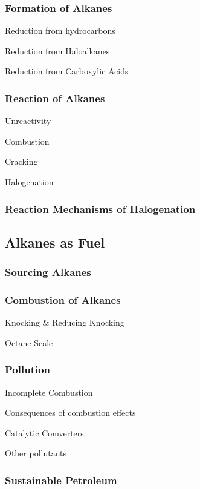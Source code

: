 \documentclass[../main]{subfiles}
\begin{document}
	\subsubsection{Formation of Alkanes}

	Reduction from hydrocarbons

	Reduction from Haloalkanes

	Reduction from Carboxylic Acids

	\subsubsection{Reaction of Alkanes}

	Unreactivity

	Combustion

	Cracking

	Halogenation

	\subsubsection{Reaction Mechanisms of Halogenation}

	\subsection{Alkanes as Fuel}

	\subsubsection{Sourcing Alkanes}

	\subsubsection{Combustion of Alkanes}

	Knocking \& Reducing Knocking

	Octane Scale

	\subsubsection{Pollution}

	Incomplete Combustion

	Consequences of combustion effects

	Catalytic Comverters

	Other pollutants

	\subsubsection{Sustainable Petroleum}
\end{document}
